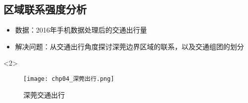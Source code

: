 \subsection{区域联系强度分析}
\begin{frame}[t]{\subsecname}
\begin{itemize}
\item 数据：2016年手机数据处理后的交通出行量
\item 解决问题：从交通出行角度探讨深莞边界区域的联系，以及交通组团的划分
\end{itemize}

\begin{overlayarea}{\textwidth}{\textheight}
\vspace{5pt}
  \begin{onlyenv}<2>
\begin{figure}
  \centering
  \texttt{[image: chp04\_深莞出行.png]}
  \caption{深莞交通出行}
\end{figure}
  \end{onlyenv}
\end{overlayarea}
\end{frame}

